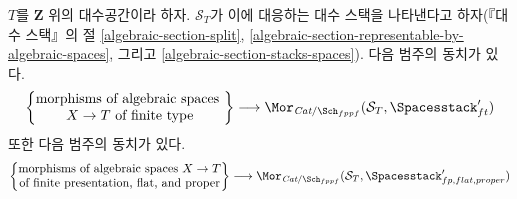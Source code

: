 \begin{lemma}
\label{lemma-extend-spaces-to-spaces}
$T$를 $\mathbf{Z}$ 위의 대수공간이라 하자. $\mathcal{S}_T$가 이에 대응하는
대수 스택을 나타낸다고 하자(『대수 스택』의 절
\ref{algebraic-section-split},
\ref{algebraic-section-representable-by-algebraic-spaces}, 그리고
\ref{algebraic-section-stacks-spaces}).
다음 범주의 동치가 있다.
$$
\left\{
\begin{matrix}
\text{morphisms of algebraic spaces }\\
X \to T\text{ of finite type}
\end{matrix}
\right\}
\longrightarrow
\Mor_{\textit{Cat}/\Sch_{fppf}}(\mathcal{S}_T, \Spacesstack'_{ft})
$$
또한 다음 범주의 동치가 있다.
$$
\left\{
\begin{matrix}
\text{morphisms of algebraic spaces }X \to T\\
\text{of finite presentation, flat, and proper}
\end{matrix}
\right\}
\longrightarrow
\Mor_{\textit{Cat}/\Sch_{fppf}}(\mathcal{S}_T,
\Spacesstack'_{fp, flat, proper})
$$
\end{lemma}

